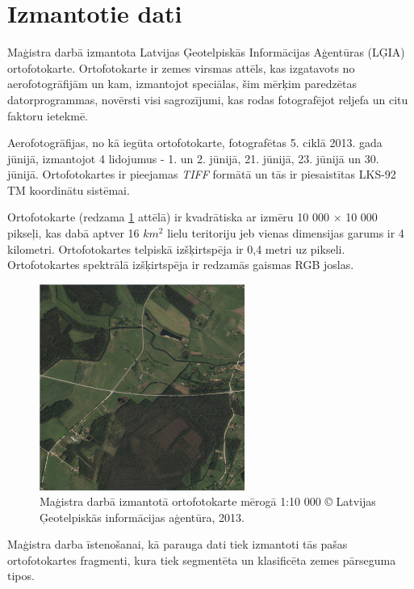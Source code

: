 \documentclass[12pt,paper=a4]{report}
\begin{document}
\section{Izmantotie dati}Maģistra darbā izmantota Latvijas Ģeotelpiskās Informācijas Aģentūras (LĢIA) ortofotokarte. Ortofotokarte ir zemes virsmas attēls, kas izgatavots no aerofotogrāfijām un kam, izmantojot speciālas, šim mērķim paredzētas datorprogrammas, novērsti visi sagrozījumi, kas rodas fotografējot reljefa un citu faktoru ietekmē. \cite{lgia}\par
Aerofotogrāfijas, no kā iegūta ortofotokarte, fotografētas 5. ciklā 2013. gada jūnijā, izmantojot 4 lidojumus - 1. un 2. jūnijā, 21. jūnijā, 23. jūnijā un 30. jūnijā. Ortofotokartes ir pieejamas \textit{TIFF} formātā un tās ir piesaistītas LKS-92 TM koordinātu sistēmai. \cite{lgia2}\par 
Ortofotokarte (redzama \ref{fig:fullIm} attēlā) ir kvadrātiska ar izmēru 10 000 $\times$ 10 000 pikseļi, kas dabā aptver 16 $km^2$ lielu teritoriju jeb vienas dimensijas garums ir 4 kilometri. Ortofotokartes telpiskā izšķirtspēja ir 0,4 metri uz pikseli. Ortofotokartes spektrālā izšķirtspēja ir redzamās gaismas RGB joslas. \par
\begin{figure}[h]
\centering
\includegraphics[width=0.6\textwidth]{original.png}
\caption{Maģistra darbā izmantotā ortofotokarte mērogā 1:10 000 © Latvijas Ģeotelpiskās informācijas aģentūra, 2013.}
\label{fig:fullIm}
\end{figure}\par
Maģistra darba īstenošanai, kā parauga dati tiek izmantoti tās pašas ortofotokartes fragmenti, kura tiek segmentēta un klasificēta zemes pārseguma tipos. 
\end{document}
